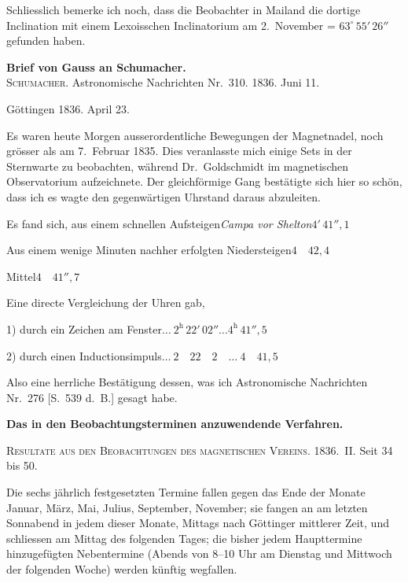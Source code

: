 \documentclass[12pt,a4paper]{article}
\begin{document}
Schliesslich bemerke ich noch, dass die Beobachter in Mailand die dortige Inclination mit einem Lexoisschen Inclinatorium am 2.~November = $63^\circ\,55'\,26''$ gefunden haben.

\bigskip
\noindent\textbf{Brief von Gauss an Schumacher.}\\
\textsc{Schumacher.} Astronomische Nachrichten Nr.~310. 1836. Juni 11.

\smallskip
\noindent
G\"ottingen 1836. April 23.

Es waren heute Morgen ausserordentliche Bewegungen der Magnetnadel, noch gr\"osser als am 7.~Februar 1835. Dies veranlasste mich einige Sets in der Sternwarte zu beobachten, w\"ahrend Dr.~Goldschmidt im magnetischen Observatorium aufzeichnete. Der gleichf\"ormige Gang best\"atigte sich hier so sch\"on, dass ich es wagte den gegenw\"artigen Uhrstand daraus abzuleiten.

Es fand sich, aus einem schnellen Aufsteigen\quad \textit{Campa vor Shelton}\quad $4'\,41''{,}1$

Aus einem wenige Minuten nachher erfolgten Niedersteigen\quad $4\quad 42{,}4$

\hspace*{2em}Mittel\quad $4\quad 41''{,}7$

Eine directe Vergleichung der Uhren gab,

1) durch ein Zeichen am Fenster\quad $\ldots\ 2^{\text{h}}\,22'\,02'' \ldots 4^{\text{h}}\,41''{,}5$

2) durch einen Inductionsimpuls\quad $\ldots\ 2\quad 22\quad 2 \quad\ldots\ 4\quad 41{,}5$

Also eine herrliche Best\"atigung dessen, was ich Astronomische Nachrichten Nr.~276 [S.~539 d.~B.] gesagt habe.

\bigskip
\begin{center}
\textbf{Das in den Beobachtungsterminen anzuwendende Verfahren.}
\end{center}
\smallskip
\noindent
\textsc{Resultate aus den Beobachtungen des magnetischen Vereins.} 1836.~II. Seit 34 bis 50.

Die sechs j\"ahrlich festgesetzten Termine fallen gegen das Ende der Monate Januar, M\"arz, Mai, Julius, September, November; sie fangen an am letzten Sonnabend in jedem dieser Monate, Mittags nach G\"ottinger mittlerer Zeit, und schliessen am Mittag des folgenden Tages; die bisher jedem Haupttermine hinzugef\"ugten Nebentermine (Abends von 8--10 Uhr am Dienstag und Mittwoch der folgenden Woche) werden k\"unftig wegfallen.
\end{document}
